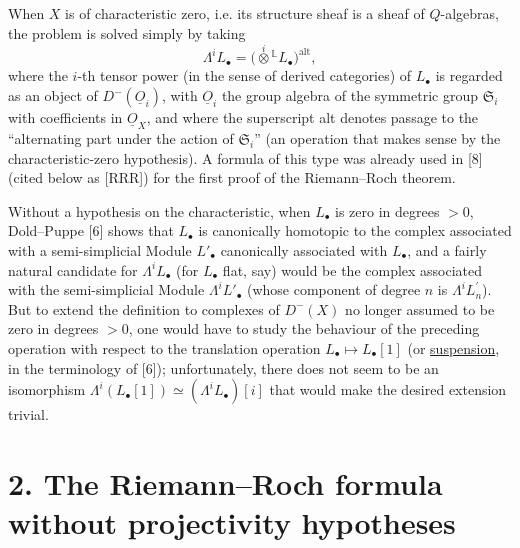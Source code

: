 %
When $X$ is of characteristic zero, i.e. its structure sheaf is a sheaf of $Q$-algebras, the problem is solved simply by taking
\begin{equation}\tag{1.2}
 \Lambda^i L_\bullet=\bigl(\overset{i}{\otimes}{}^{\mathbb L}L_\bullet\bigr)^{\mathrm{alt}},
\end{equation}
where the $i$-th tensor power (in the sense of derived categories) of $L_\bullet$ is regarded as an object of $D^-(\underline{O}_i)$, with $\underline{O}_i$ the group algebra of the symmetric group $\mathfrak S_i$ with coefficients in $\underline{O}_X$, and where the superscript alt denotes passage to the ``alternating part under the action of $\mathfrak S_i$'' (an operation that makes sense by the characteristic-zero hypothesis). A formula of this type was already used in [8] (cited below as [RRR]) for the first proof of the Riemann--Roch theorem.

Without a hypothesis on the characteristic, when $L_\bullet$ is zero in degrees $>0$, Dold--Puppe [6] shows that $L_\bullet$ is canonically homotopic to the complex associated with a semi-simplicial Module $L'_\bullet$ canonically associated with $L_\bullet$, and a fairly natural candidate for $\Lambda^iL_\bullet$ (for $L_\bullet$ flat, say) would be the complex associated with the semi-simplicial Module $\Lambda^iL'_\bullet$ (whose component of degree $n$ is $\Lambda^i L^{\prime}_n$). But to extend the definition to complexes of $D^-(X)$ no longer assumed to be zero in degrees $>0$, one would have to study the behaviour of the preceding operation with respect to the translation operation $L_\bullet\mapsto L_\bullet[1]$ (or \uline{suspension}, in the terminology of [6]); unfortunately, there does not seem to be an isomorphism $\Lambda^i(L_\bullet[1])\simeq(\Lambda^i L_\bullet)[i]$ that would make the desired extension trivial.

\section*{2. The Riemann--Roch formula without projectivity hypotheses}

